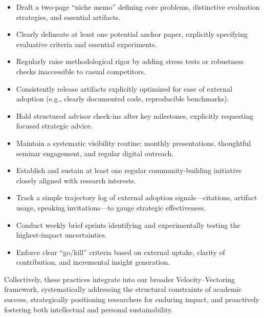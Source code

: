 \begin{itemize}[leftmargin=*]
  \item Draft a two-page ``niche memo'' defining core problems, distinctive evaluation strategies, and essential artifacts.
  \item Clearly delineate at least one potential anchor paper, explicitly specifying evaluative criteria and essential experiments.
  \item Regularly raise methodological rigor by adding stress tests or robustness checks inaccessible to casual competitors.
  \item Consistently release artifacts explicitly optimized for ease of external adoption (e.g., clearly documented code, reproducible benchmarks).
  \item Hold structured advisor check-ins after key milestones, explicitly requesting focused strategic advice.
  \item Maintain a systematic visibility routine: monthly presentations, thoughtful seminar engagement, and regular digital outreach.
  \item Establish and sustain at least one regular community-building initiative closely aligned with research interests.
  \item Track a simple trajectory log of external adoption signals---citations, artifact usage, speaking invitations---to gauge strategic effectiveness.
  \item Conduct weekly brief sprints identifying and experimentally testing the highest-impact uncertainties.
  \item Enforce clear ``go/kill'' criteria based on external uptake, clarity of contribution, and incremental insight generation.
\end{itemize}

Collectively, these practices integrate into our broader Velocity--Vectoring framework, systematically addressing the structural constraints of academic success, strategically positioning researchers for enduring impact, and proactively fostering both intellectual and personal sustainability.
